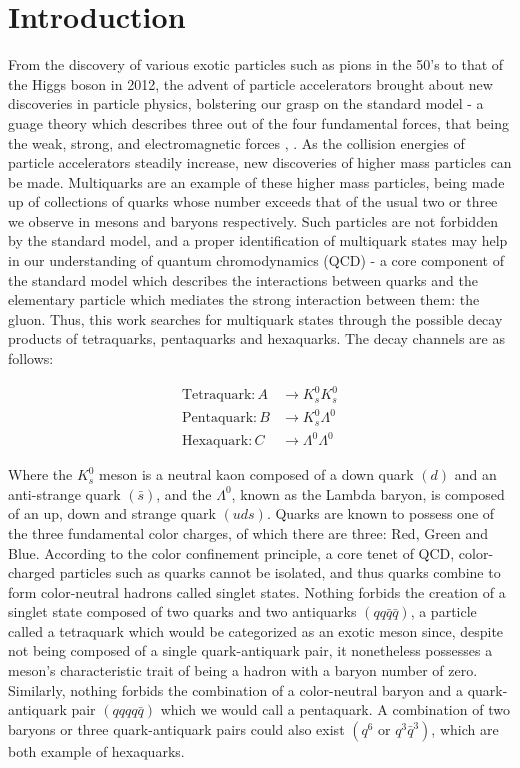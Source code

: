 \documentclass{article}
\begin{document}
\section{Introduction}
From the discovery of various exotic particles such as pions in the 50's to that of the Higgs
boson in 2012, the advent of particle accelerators brought about new discoveries in particle physics,
bolstering our grasp on the standard model - a guage theory which describes three out of the four
fundamental forces, that being the weak, strong, and electromagnetic forces \cite{KLDiscovery}, \cite{HiggsDiscovery}. 
As the collision energies of particle accelerators steadily increase, new discoveries of higher mass particles 
can be made. 
Multiquarks are an example of these higher mass particles, being made up of collections of quarks
whose number exceeds that of the usual two or three we observe in mesons and baryons respectively.
Such particles are not forbidden by the standard model, and a proper identification of multiquark 
states may help in our understanding of quantum chromodynamics (QCD) - a core component of the standard 
model which describes the interactions between quarks and the elementary particle which mediates 
the strong interaction between them: the gluon. Thus, this work searches for multiquark states 
through the possible decay products of tetraquarks, pentaquarks and hexaquarks. The decay channels
are as follows:

\begin{align*}
\text{Tetraquark}: A &\rightarrow K^0_sK^0_s \\
\text{Pentaquark}: B &\rightarrow K^0_s\Lambda^0 \\
\text{Hexaquark}:  C &\rightarrow \Lambda^0\Lambda^0
\end{align*}

Where the $K^0_s$ meson is a neutral kaon composed of a down quark $(d)$ and an
anti-strange quark $(\bar{s})$, and the $\Lambda^0$, known as the Lambda baryon,
is composed of an up, down and strange quark $(uds)$. Quarks are known to
possess one of the three fundamental color charges, of which there are three:
Red, Green and Blue. According to the color confinement principle, a core tenet
of QCD, color-charged particles such as quarks cannot be isolated, and thus
quarks combine to form color-neutral hadrons called singlet states. Nothing
forbids the creation of a singlet state composed of two quarks and two
antiquarks $(qq\bar{q}\bar{q})$, a particle called a tetraquark which would be
categorized as an exotic meson since, despite not being composed of a single
quark-antiquark pair, it nonetheless possesses a meson's characteristic trait of
being a hadron with a baryon number of zero. Similarly, nothing forbids the
combination of a color-neutral baryon and a quark-antiquark pair $(qqqq\bar{q})$
which we would call a pentaquark. A combination of two baryons or three
quark-antiquark pairs could also exist $(q^6 \text{ or } q^3\bar{q}^{3})$, which
are both example of hexaquarks.
\end{document}
